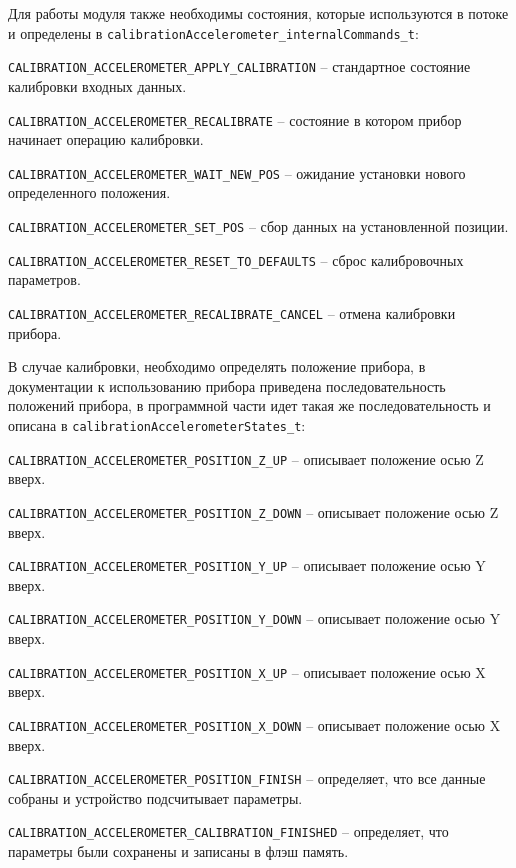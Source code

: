 Для работы модуля также необходимы состояния, которые используются в потоке и определены в \lstinline{calibrationAccelerometer_internalCommands_t}:

\begin{enumerate_num}
    \item \lstinline{CALIBRATION_ACCELEROMETER_APPLY_CALIBRATION} -- стандартное состояние калибровки входных данных.
    \item \lstinline{CALIBRATION_ACCELEROMETER_RECALIBRATE} -- состояние в котором прибор начинает операцию калибровки.
    \item \lstinline{CALIBRATION_ACCELEROMETER_WAIT_NEW_POS} -- ожидание установки нового определенного положения.
    \item \lstinline{CALIBRATION_ACCELEROMETER_SET_POS} -- сбор данных на установленной позиции.
    \item \lstinline{CALIBRATION_ACCELEROMETER_RESET_TO_DEFAULTS} -- сброс калибровочных параметров.
    \item \lstinline{CALIBRATION_ACCELEROMETER_RECALIBRATE_CANCEL} -- отмена калибровки прибора.
\end{enumerate_num}

В случае калибровки, необходимо определять положение прибора, в документации к использованию прибора приведена последовательность положений прибора,
в программной части идет такая же последовательность и описана в \lstinline{calibrationAccelerometerStates_t}:

\begin{enumerate_num}
    \item \lstinline{CALIBRATION_ACCELEROMETER_POSITION_Z_UP} -- описывает положение осью Z вверх.
    \item \lstinline{CALIBRATION_ACCELEROMETER_POSITION_Z_DOWN} -- описывает положение осью Z вверх.
    \item \lstinline{CALIBRATION_ACCELEROMETER_POSITION_Y_UP} -- описывает положение осью Y вверх.
    \item \lstinline{CALIBRATION_ACCELEROMETER_POSITION_Y_DOWN} -- описывает положение осью Y вверх.
    \item \lstinline{CALIBRATION_ACCELEROMETER_POSITION_X_UP} -- описывает положение осью X вверх.
    \item \lstinline{CALIBRATION_ACCELEROMETER_POSITION_X_DOWN} -- описывает положение осью X вверх.
    \item \lstinline{CALIBRATION_ACCELEROMETER_POSITION_FINISH} -- определяет, что все данные собраны и устройство подсчитывает параметры.
    \item \lstinline{CALIBRATION_ACCELEROMETER_CALIBRATION_FINISHED} -- определяет, что параметры были сохранены и записаны в флэш память.
\end{enumerate_num}

